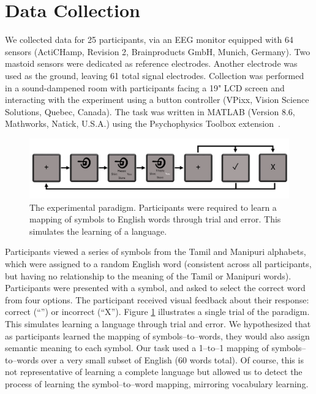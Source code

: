 \section{Data Collection}

We collected data for 25 participants, via an EEG monitor equipped with 64 sensors (ActiCHamp, Revision 2, Brainproducts GmbH, Munich, Germany). Two mastoid sensors were dedicated as reference electrodes. Another electrode was used as the ground, leaving 61 total signal electrodes. Collection was performed in a sound-dampened room with participants facing a 19" LCD screen and interacting with the experiment using a button controller (VPixx, Vision Science Solutions, Quebec, Canada). The task was written in MATLAB (Version 8.6, Mathworks, Natick, U.S.A.) using the Psychophysics Toolbox extension~\cite{brainard1997psychophysics}.

\begin{figure}[t]
  \centering
  \includegraphics[width=\linewidth]{figures/experiment}
  \caption{The experimental paradigm. Participants were required to learn a mapping of symbols to English words through trial and error. This simulates the learning of a language.}
  \label{fig:experiment}
\end{figure}

Participants viewed a series of symbols from the Tamil and Manipuri alphabets, which were assigned to a random English word (consistent across all participants, but having no relationship to the meaning of the Tamil or Manipuri words).  Participants were presented with a symbol, and asked to select the correct word from four options. The participant received visual feedback about their response: correct (``\CheckmarkBold'') or incorrect (``X''). Figure \ref{fig:experiment} illustrates a single trial of the paradigm. This simulates learning a language through trial and error. We hypothesized that as participants learned the mapping of symbols--to--words, they would also assign semantic meaning to each symbol. Our task used a 1--to--1 mapping of symbols--to--words over a very small subset of English (60 words total). Of course, this is not representative of learning a complete language but allowed us to detect the process of learning the symbol--to--word mapping, mirroring vocabulary learning.
  
